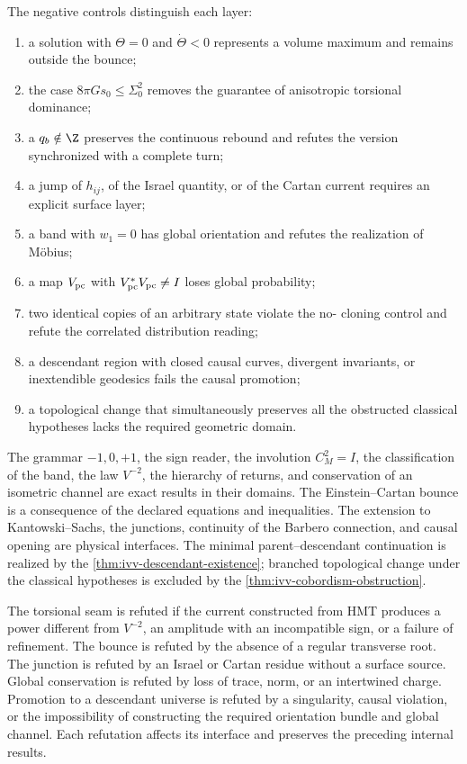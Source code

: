 The negative controls distinguish each layer:
\begin{enumerate}
 \item a solution with \(\Theta=0\) and \(\dot\Theta<0\) represents a
       volume maximum and remains outside the bounce;
 \item the case \(8\pi Gs_0\leq\Sigma_0^2\) removes the guarantee of
       anisotropic torsional dominance;
 \item a \(q_b\notin\Z\) preserves the continuous rebound and refutes the version
       synchronized with a complete turn;
 \item a jump of \(h_{ij}\), of the Israel quantity, or of the
       Cartan current requires an explicit surface layer;
 \item a band with \(w_1=0\) has global orientation and refutes the
       realization of Möbius;
 \item a map \(V_{\rm pc}\) with \(V_{\rm pc}^*V_{\rm pc}\ne I\) loses
       global probability;
 \item two identical copies of an arbitrary state violate the no-
       cloning control and refute the correlated distribution reading;
 \item a descendant region with closed causal curves, divergent invariants,
       or inextendible geodesics fails the causal promotion;
 \item a topological change that simultaneously preserves all the
       obstructed classical hypotheses lacks the required geometric
       domain.
\end{enumerate}

\begin{proofstatusbox}
The grammar \(-1,0,+1\), the sign reader, the involution \(C_M^2=I\), the classification of the band, the law \(V^{-2}\), the hierarchy of returns, and conservation of an isometric channel are exact results in their domains. The Einstein--Cartan bounce is a consequence of the declared equations and inequalities. The extension to Kantowski--Sachs, the junctions, continuity of the Barbero connection, and causal opening are physical interfaces. The minimal parent--descendant continuation is realized by the \cref{thm:ivv-descendant-existence}; branched topological change under the classical hypotheses is excluded by the \cref{thm:ivv-cobordism-obstruction}.
\end{proofstatusbox}

\begin{falsifierbox}
The torsional seam is refuted if the current constructed from HMT produces a power different from \(V^{-2}\), an amplitude with an incompatible sign, or a failure of refinement. The bounce is refuted by the absence of a regular transverse root. The junction is refuted by an Israel or Cartan residue without a surface source. Global conservation is refuted by loss of trace, norm, or an intertwined charge. Promotion to a descendant universe is refuted by a singularity, causal violation, or the impossibility of constructing the required orientation bundle and global channel. Each refutation affects its interface and preserves the preceding internal results.
\end{falsifierbox}

